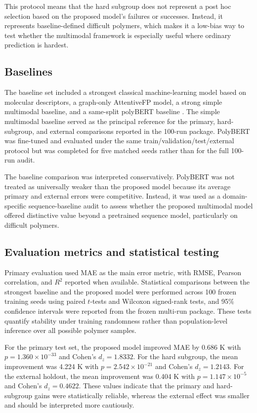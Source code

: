 \documentclass[review,12pt]{elsarticle}
\begin{document}
This protocol means that the hard subgroup does not represent a post hoc selection based on the proposed model's failures or successes. Instead, it represents baseline-defined difficult polymers, which makes it a low-bias way to test whether the multimodal framework is especially useful where ordinary prediction is hardest.

\subsection{Baselines}

The baseline set included a strongest classical machine-learning model based on molecular descriptors, a graph-only AttentiveFP model, a strong simple multimodal baseline, and a same-split polyBERT baseline \cite{kuenneth2023polybert}. The simple multimodal baseline served as the principal reference for the primary, hard-subgroup, and external comparisons reported in the 100-run package. PolyBERT was fine-tuned and evaluated under the same train/validation/test/external protocol but was completed for five matched seeds rather than for the full 100-run audit.

The baseline comparison was interpreted conservatively. PolyBERT was not treated as universally weaker than the proposed model because its average primary and external errors were competitive. Instead, it was used as a domain-specific sequence-baseline audit to assess whether the proposed multimodal model offered distinctive value beyond a pretrained sequence model, particularly on difficult polymers.

\subsection{Evaluation metrics and statistical testing}

Primary evaluation used MAE as the main error metric, with RMSE, Pearson correlation, and $R^2$ reported when available. Statistical comparisons between the strongest baseline and the proposed model were performed across 100 frozen training seeds using paired $t$-tests and Wilcoxon signed-rank tests, and 95\% confidence intervals were reported from the frozen multi-run package. These tests quantify stability under training randomness rather than population-level inference over all possible polymer samples.

For the primary test set, the proposed model improved MAE by 0.686 K with $p=1.360\times 10^{-33}$ and Cohen's $d_z=1.8332$. For the hard subgroup, the mean improvement was 4.224 K with $p=2.542\times 10^{-21}$ and Cohen's $d_z=1.2143$. For the external holdout, the mean improvement was 0.404 K with $p=1.147\times 10^{-5}$ and Cohen's $d_z=0.4622$. These values indicate that the primary and hard-subgroup gains were statistically reliable, whereas the external effect was smaller and should be interpreted more cautiously.
\end{document}
